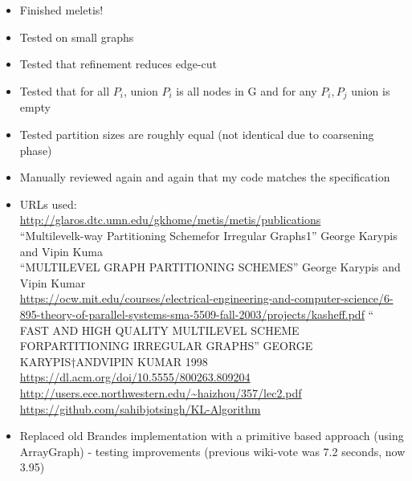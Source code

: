 \documentclass[a4paper,12pt,english]{article}
\newcommand{\printdatetitle}[1]{
      \texorpdfstring{\printdate{#1}}{#1}
    }
\begin{document}
\section*{\printdatetitle{2020/12/22}}
\begin{itemize}
\item Finished meletis!
\item Tested on small graphs
\item Tested that refinement reduces edge-cut
\item Tested that for all $P_i$, union $P_i$ is all nodes in G and for any $P_i, P_j$ union is empty
\item Tested partition sizes are roughly equal (not identical due to coarsening phase)
\item Manually reviewed again and again that my code matches the specification
\item URLs used:\\
\url{http://glaros.dtc.umn.edu/gkhome/metis/metis/publications}\\
``Multilevelk-way Partitioning Schemefor Irregular Graphs1'' George Karypis and Vipin Kuma\\
``MULTILEVEL GRAPH PARTITIONING SCHEMES'' George Karypis and Vipin Kumar\\
\url{https://ocw.mit.edu/courses/electrical-engineering-and-computer-science/6-895-theory-of-parallel-systems-sma-5509-fall-2003/projects/kasheff.pdf}
`` FAST AND HIGH QUALITY MULTILEVEL SCHEME FORPARTITIONING IRREGULAR GRAPHS'' GEORGE  KARYPIS†ANDVIPIN  KUMAR 1998\\
\url{https://dl.acm.org/doi/10.5555/800263.809204}\\
\url{http://users.ece.northwestern.edu/~haizhou/357/lec2.pdf}\\
\url{https://github.com/sahibjotsingh/KL-Algorithm}
\item Replaced old Brandes implementation with a primitive based approach (using ArrayGraph) - testing improvements (previous wiki-vote was 7.2 seconds, now 3.95)
\end{itemize}
\end{document}
